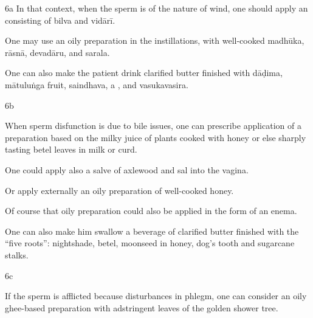\begin{translation}
\begin{sloka}
 \end{sloka}
 
 \item[6a] In that context, when the sperm is of the nature of wind, one
should apply an 
consisting of \gls{bilva} and \gls{vidārī}.
 
 
  One may use an oily preparation in the instillations, with well-cooked 
  \gls{madhūka},
  \gls{rāsnā},
  \gls{devadāru},
  and \gls{sarala}.
 
 
 
  One can also make the patient drink clarified butter finished with \gls{dāḍima}, 
  \gls{mātuluṅga} fruit, \gls{saindhava}, a , and 
  \gls{vasukavasira}.
 
 
 \item[6b]
 
   When sperm disfunction is due to bile issues, one can prescribe application of 
   a preparation based on the milky juice of plants cooked with honey or else 
   sharply tasting betel leaves in milk or curd.
 
 
  One could apply also a salve of axlewood and sal into the vagina.
 
 
  Or apply externally an oily preparation of well-cooked honey.
 
 
  Of course that oily preparation could also be applied in the form of an enema.
 
 
  One can also make him swallow a beverage of clarified butter finished with the 
  “five roots”: nightshade, betel, moonseed in honey, dog’s tooth and sugarcane 
  stalks. 
 
 \item[6c]
 
  If the sperm is afflicted because disturbances in phlegm, one can consider an 
  oily ghee-based preparation with adstringent leaves of the golden shower tree.
 

\end{translation}
